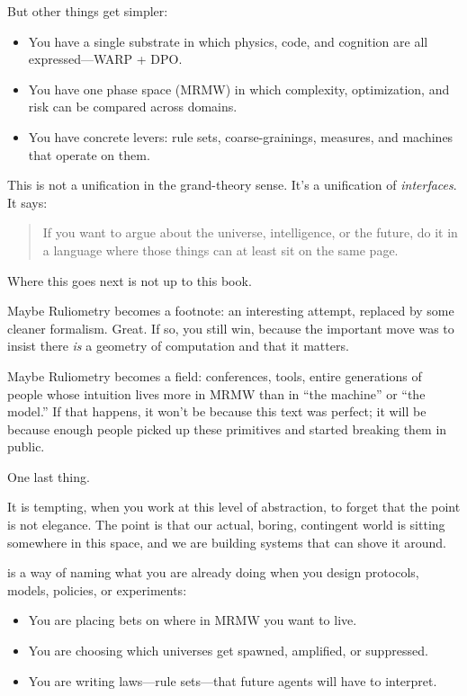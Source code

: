 But other things get simpler:

\begin{itemize}
  \item You have a single substrate in which physics, code, and cognition are all
        expressed—WARP + DPO.

  \item You have one phase space (MRMW) in which complexity, optimization, and
        risk can be compared across domains.

  \item You have concrete levers: rule sets, coarse-grainings, measures, and
        machines that operate on them.
\end{itemize}

This is not a unification in the grand-theory sense. It’s a unification of
\emph{interfaces}. It says:

\begin{quote}
If you want to argue about the universe, intelligence, or the future,  
do it in a language where those things can at least sit on the same page.
\end{quote}

\medskip

Where this goes next is not up to this book.

Maybe Ruliometry becomes a footnote: an interesting attempt, replaced by some
cleaner formalism. Great. If so, you still win, because the important move was
to insist there \emph{is} a geometry of computation and that it matters.

Maybe Ruliometry becomes a field: conferences, tools, entire generations of
people whose intuition lives more in MRMW than in “the machine” or “the model.”
If that happens, it won’t be because this text was perfect; it will be because
enough people picked up these primitives and started breaking them in public.

\medskip

One last thing.

It is tempting, when you work at this level of abstraction, to forget that
the point is not elegance. The point is that our actual, boring, contingent
world is sitting somewhere in this space, and we are building systems that
can shove it around.

\COMPUTER{} is a way of naming what you are already doing when you design
protocols, models, policies, or experiments:

\begin{itemize}
  \item You are placing bets on where in MRMW you want to live.
  \item You are choosing which universes get spawned, amplified, or suppressed.
  \item You are writing laws—rule sets—that future agents will have to interpret.
\end{itemize}

